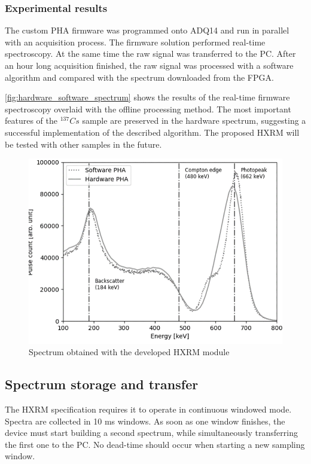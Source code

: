 \subsubsection{Experimental results}

The custom PHA firmware was programmed onto ADQ14 and run in parallel
with an acquisition process. The firmware solution performed real-time
spectroscopy. At the same time the raw signal was transferred to the PC.
After an hour long acquisition finished, the raw signal was processed 
with a software algorithm and compared with the spectrum downloaded from the FPGA.


\autoref{fig:hardware_software_spectrum}
shows the results of the real-time firmware spectroscopy overlaid
with the offline processing method. The most important features
of the $^{137} Cs$ sample are preserved in the hardware spectrum,
suggesting a successful implementation of the described algorithm.
The proposed HXRM will be tested with other samples in the future.

\begin{figure}[H]
  \centering
  \includegraphics[width=\linewidth]{media/hardware_software_spectrum.png}
  \caption{Spectrum obtained with the developed HXRM module}
  \label{fig:hardware_software_spectrum} 
\end{figure}

\subsection{Spectrum storage and transfer}

The HXRM specification requires it to operate in continuous windowed mode.
Spectra are collected in 10 ms windows. As soon as one window finishes,
the device must start building a second spectrum, while simultaneously 
transferring the first one to the PC. No dead-time should occur 
when starting a new sampling window.


